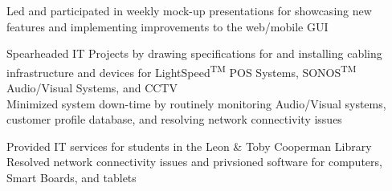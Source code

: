 \documentclass[a4paper]{Resume}
\begin{document}
\begin{onehalfspace}
\pt Led and participated in weekly mock-up presentations for showcasing new features and implementing improvements to the web/mobile GUI  \\

\sectionsep



\pt Spearheaded IT Projects by drawing specifications for and installing cabling infrastructure and devices for LightSpeed\textsuperscript{TM} POS Systems,  SONOS\textsuperscript{TM} Audio/Visual Systems, and CCTV \\

\pt Minimized system down-time by routinely monitoring Audio/Visual systems, customer profile database, and resolving network connectivity issues \\


\sectionsep


\pt Provided IT services for students in the Leon \& Toby Cooperman Library \\

\pt Resolved network connectivity issues and privsioned software for computers, Smart Boards, and tablets \\
\sectionsep

\end{onehalfspace}

\end{document}
